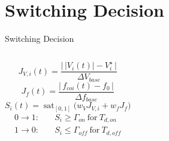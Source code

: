 \documentclass{beamer}
\begin{document}
\section{Switching Decision}
\begin{frame}{Switching Decision}
\abovecaptionskip=1pt \belowcaptionskip=0pt
\vspace*{-0.60cm}
\begin{columns}[t,onlytextwidth]
\vspace{0.30cm}
\scriptsize
\setlength{\jot}{0.14cm}
\begin{equation}
J_{V,i}(t)=\frac{\bigl|\,|V_i(t)|-V_i^{\star}\,\bigr|}{\Delta V_{base}}
\end{equation}
\begin{equation}
J_{f}(t)=\frac{\bigl|\,f_{coi}(t)-f_0\,\bigr|}{\Delta f_{base}}
\end{equation}
\begin{equation}
S_i(t)=\operatorname{sat}_{[0,1]}\!\bigl(w_V J_{V,i}+w_f J_f\bigr)
\end{equation}
\begin{align}
0\to1:&\quad S_i\ge\Gamma_{on}\ \text{for}\ T_{d,on}\\
1\to0:&\quad S_i\le\Gamma_{off}\ \text{for}\ T_{d,off}
\end{align}


\end{columns}
\end{frame}
\end{document}
